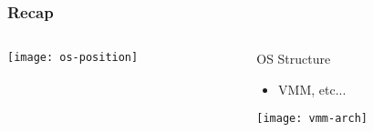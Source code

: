 \begin{frame}[plain]
	\frametitle{Recap}
	
	
	
	\begin{columns}
		
		\begin{column}{.5\textwidth}
			
			\texttt{[image: os-position]}
			
		\end{column}
		
		\begin{column}{.5\textwidth}
			
			\Large
			OS Structure	
			\begin{itemize}
					\item VMM, etc...
			\end{itemize}	
			
			\texttt{[image: vmm-arch]}		
		\end{column}
		
		
	\end{columns}
	
	
\end{frame}




